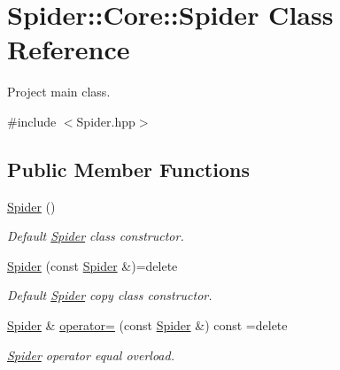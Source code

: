 \hypertarget{class_spider_1_1_core_1_1_spider}{}\section{Spider\+:\+:Core\+:\+:Spider Class Reference}
\label{class_spider_1_1_core_1_1_spider}


Project main class.  




{\ttfamily \#include $<$Spider.\+hpp$>$}

\subsection*{Public Member Functions}
\begin{DoxyCompactItemize}
\item 
\mbox{\label{class_spider_1_1_core_1_1_spider_a4eaffa24280e6d48a5d751ba51aadb66}} 
\hyperlink{class_spider_1_1_core_1_1_spider_a4eaffa24280e6d48a5d751ba51aadb66}{Spider} ()
\begin{DoxyCompactList}\small\item\em Default \hyperlink{class_spider_1_1_core_1_1_spider}{Spider} class constructor. \end{DoxyCompactList}\item 
\mbox{\label{class_spider_1_1_core_1_1_spider_a0c84bc36d453387da8535c09c6c610f3}} 
\hyperlink{class_spider_1_1_core_1_1_spider_a0c84bc36d453387da8535c09c6c610f3}{Spider} (const \hyperlink{class_spider_1_1_core_1_1_spider}{Spider} \&)=delete
\begin{DoxyCompactList}\small\item\em Default \hyperlink{class_spider_1_1_core_1_1_spider}{Spider} copy class constructor. \end{DoxyCompactList}\item 
\mbox{\label{class_spider_1_1_core_1_1_spider_a69ab9672d6e1c6afdf577ba9f2de36be}} 
\hyperlink{class_spider_1_1_core_1_1_spider}{Spider} \& \hyperlink{class_spider_1_1_core_1_1_spider_a69ab9672d6e1c6afdf577ba9f2de36be}{operator=} (const \hyperlink{class_spider_1_1_core_1_1_spider}{Spider} \&) const =delete
\begin{DoxyCompactList}\small\item\em \hyperlink{class_spider_1_1_core_1_1_spider}{Spider} operator equal overload. \end{DoxyCompactList}\item 

\end{DoxyCompactItemize}
